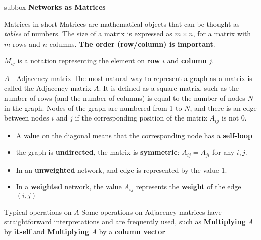 \begin{subbox}{subbox}{}
  \centering
  \Large{\textbf{Networks as Matrices}}
\end{subbox}


\begin{textbox}{Matrices in short}
  Matrices are mathematical objects that can be thought as \textit{tables} of numbers. The size of a matrix is expressed as $m \times n$, for a matrix with $m$ rows and $n$ columns. \textbf{The order (row/column) is important}.

  \textbf{$M_{ij}$} is a notation representing the element on \textbf{row} $i$ and \textbf{column} $j$.


\end{textbox}

\begin{textbox}{$A$ - Adjacency matrix}
  The most natural way to represent a graph as a matrix is called the Adjacency matrix $A$. It is defined as a square matrix, such as the number of rows (and the number of columns) is equal to the number of nodes $N$ in the graph. Nodes of the graph are numbered from 1 to $N$, and there is an edge between nodes $i$ and $j$ if the corresponding position of the matrix $A_{ij}$ is not $0$.

  \begin{itemize}
    \item A value on the diagonal means that the corresponding node has a \textbf{self-loop}
    \item the graph is \textbf{undirected}, the matrix is \textbf{symmetric}: $A_{ij}=A_{ji}$ for any $i,j$.
    \item In an \textbf{unweighted} network, and edge is represented by the value $1$.
    \item In a \textbf{weighted} network, the value $A_{ij}$ represents the \textbf{weight} of the edge $(i,j)$
  \end{itemize}
\end{textbox}


\begin{textbox}{Typical operations on $A$}
  Some operations on Adjacency matrices have straightforward interpretations and are frequently used, such as \textbf{Multiplying} $A$ by \textbf{itself} and \textbf{Multiplying} $A$ by a \textbf{column vector}
\end{textbox}


